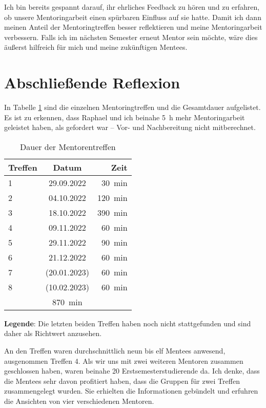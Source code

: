 \documentclass[
    paper=a4,
    div=calc,
    numbers=noendperiod,
]{scrartcl}
\newcommand{\legend}[1]{\par\footnotesize\textbf{Legende}: #1\par}
\begin{document}
        Ich bin bereits gespannt darauf, ihr ehrliches Feedback zu hören und zu erfahren, ob unsere Mentoringarbeit einen spürbaren Einfluss auf sie hatte. Damit ich dann meinen Anteil der Mentoringtreffen besser reflektieren und meine Mentoringarbeit verbessern. Falls ich im nächsten Semester erneut Mentor sein möchte, wäre dies äußerst hilfreich für mich und meine zukünftigen Mentees. 
        
\section{Abschließende Reflexion}
    In Tabelle \ref{tab:time} sind die einzelnen Mentoringtreffen und die Gesamtdauer aufgelistet. Es ist zu erkennen, dass Raphael und ich beinahe \SI{5}{\hour} mehr Mentoringarbeit geleistet haben, als gefordert war -- Vor- und Nachbereitung nicht mitberechnet. 

    \begin{table}[htb]
        \centering
        \caption{Dauer der Mentorentreffen}
        \label{tab:time}
        \begin{tabular}{lcr}\toprule
            Treffen &   Datum           &   Zeit\\\midrule
            1       &   29.09.2022      &   \SI{30}{\minute}\\
            2       &   04.10.2022      &   \SI{120}{\minute}\\
            3       &   18.10.2022      &   \SI{390}{\minute}\\
            4       &   09.11.2022      &   \SI{60}{\minute}\\
            5       &   29.11.2022      &   \SI{90}{\minute}\\
            6       &   21.12.2022      &   \SI{60}{\minute}\\
            7       &   (20.01.2023)    &   \SI{60}{\minute}\\
            8       &   (10.02.2023)    &   \SI{60}{\minute}\\
            \addlinespace
            \multicolumn{2}{l}{gesamt}  &   \SI{870}{\minute}\\\bottomrule
        \end{tabular}
        \vspace{0.5em}
        \legend{Die letzten beiden Treffen haben noch nicht stattgefunden und sind daher als Richtwert anzusehen.}
    \end{table}

    An den Treffen waren durchschnittlich neun bis elf Mentees anwesend, ausgenommen Treffen 4. Als wir uns mit zwei weiteren Mentoren zusammen geschlossen haben, waren beinahe 20 Erstsemesterstudierende da. Ich denke, dass die Mentees sehr davon profitiert haben, dass die Gruppen für zwei Treffen zusammengelegt wurden. Sie erhielten die Informationen gebündelt und erfuhren die Ansichten von vier verschiedenen Mentoren. 
\end{document}
